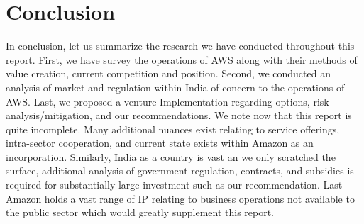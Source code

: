 \documentclass[a4paper, 12pt]{article}
\begin{document}
\section{Conclusion}
In conclusion, let us summarize the research we have conducted throughout this report.
First, we have survey the operations of AWS along with their methods of value creation, current competition and position.
Second, we conducted an analysis of market and regulation within India of concern to the operations of AWS.
Last, we proposed a venture Implementation regarding options, risk analysis/mitigation, and our recommendations.
We note now that this report is quite incomplete.
Many additional nuances exist relating to service offerings, intra-sector cooperation, and current state exists within Amazon as an incorporation.
Similarly, India as a country is vast an we only scratched the surface, additional analysis of government regulation, contracts, and subsidies is required for substantially large investment such as our recommendation.
Last Amazon holds a vast range of IP relating to business operations not available to the public sector which would greatly supplement this report.

\newpage
{}
{}

\newpage
{}
\end{document}
